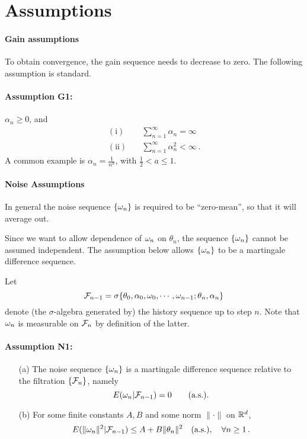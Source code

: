\section{Assumptions}

\paragraph{Gain assumptions}

To obtain convergence, the gain sequence needs to decrease to zero.
The following assumption is standard.

\paragraph{Assumption G1:}  $\alpha_n \ge 0$, and
\begin{align*}
\mathrm{(i)} \quad & \sum_{n=1}^\infty \alpha_n = \infty\\
\mathrm{(ii)} \quad& \sum_{n=1}^\infty \alpha_n^2 < \infty\,.
\end{align*}
A common example is  $\displaystyle{\alpha_n=\frac{1}{n^a}}$, with
$\frac{1}{2} < a \le 1$.

\paragraph{Noise Assumptions}

In general the noise sequence $\{\omega_n\}$ is required to be ``zero-mean'',
so that it will average out.

Since we want to allow dependence
of $\omega_n$ on $\theta_n$, the sequence $\{\omega_n\}$ cannot be assumed
independent. The assumption below allows $\{\omega_n\}$ to be a martingale
difference sequence.

Let
$$
\mathcal F_{n-1} = \sigma \{ \theta_0, \alpha_0, \omega_0, \cdots, \omega_{n-1};
\theta_n, \alpha_n\}
$$
denote (the $\sigma$-algebra generated by) the history sequence up to
step $n$. Note that $\omega_n$ is measurable on $\mathcal F_n$ by definition of the latter.

\paragraph{Assumption N1:}
\begin{itemize}
\item[(a)]
The noise sequence $\{\omega_n\}$ is a martingale difference sequence relative to the
filtration $\{\mathcal F_n\}$, namely
$$
E(\omega_n | \mathcal F_{n-1}) = 0 \qquad \text{(a.s.)}.
$$
\item[(b)] For some finite constants $A,B$ and some norm $\|\cdot \|$ on $\mathbb{R}^d$,
$$E(\| \omega_n\|^2 | \mathcal F_{n-1}) \le A + B \| \theta_n\|^2 \quad \text{(a.s.)},
\quad \forall n\ge 1\,.$$
\end{itemize}

